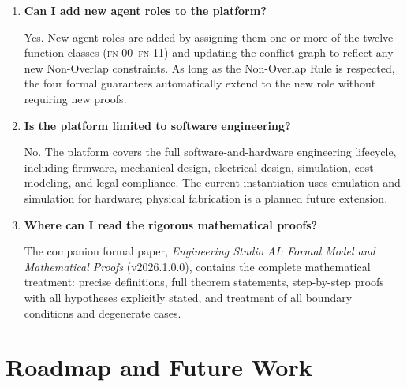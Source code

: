 \documentclass[12pt]{article}
\newcommand{\FN}[1]{\textsc{fn-#1}}
\begin{document}
\begin{enumerate}
    \item \textbf{Can I add new agent roles to the platform?}

          Yes.
          New agent roles are added by assigning them one or more of
          the twelve function classes (\FN{00}--\FN{11}) and updating
          the conflict graph to reflect any new Non-Overlap
          constraints.
          As long as the Non-Overlap Rule is respected, the four
          formal guarantees automatically extend to the new role
          without requiring new proofs.

    \item \textbf{Is the platform limited to software engineering?}

          No.
          The platform covers the full software-and-hardware
          engineering lifecycle, including firmware, mechanical
          design, electrical design, simulation, cost modeling, and
          legal compliance.
          The current instantiation uses emulation and simulation for
          hardware; physical fabrication is a planned future extension.

    \item \textbf{Where can I read the rigorous mathematical proofs?}

          The companion formal paper,
          \textit{Engineering Studio AI: Formal Model and Mathematical
          Proofs} (v2026.1.0.0), contains the complete mathematical
          treatment: precise definitions, full theorem statements,
          step-by-step proofs with all hypotheses explicitly stated,
          and treatment of all boundary conditions and degenerate cases.

\end{enumerate}

\section{Roadmap and Future Work}
\label{sec:roadmap}
\end{document}
